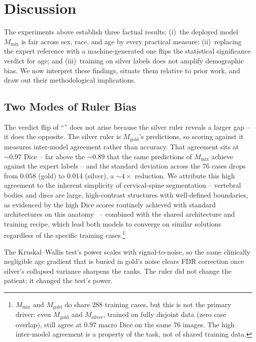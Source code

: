 \section{Discussion}
\label{sec:discussion}

The experiments above establish three factual results: (i)~the deployed model
$M_{\mathrm{mix}}$ is fair across sex, race, and age by every practical measure;
(ii)~replacing the expert reference with a machine-generated one flips the
statistical significance verdict for age; and (iii)~training on silver labels does
not amplify demographic bias. We now interpret these findings, situate them
relative to prior work, and draw out their methodological implications.

\subsection{Two Modes of Ruler Bias}
\label{sec:ruler_modes}

The verdict flip of ``'' does not arise because the
silver ruler reveals a larger gap -- it does the opposite. The silver ruler is
$M_{\mathrm{gold}}$'s predictions, so scoring against it measures inter-model
agreement rather than accuracy. That agreement sits at ${\sim}0.97$ Dice -- far
above the ${\sim}0.89$ that the same predictions of $M_{\mathrm{mix}}$ achieve
against the expert labels -- and the standard
deviation across the $76$ cases drops from $0.058$ (gold) to $0.014$ (silver), a
${\sim}4\times$ reduction. We attribute this high agreement to the inherent
simplicity of cervical-spine segmentation -- vertebral bodies and discs are large,
high-contrast structures with well-defined boundaries, as evidenced by the high
Dice scores routinely achieved with standard architectures on this
anatomy~\cite{zhou2025cspineseg} -- combined with the shared architecture and
training recipe, which lead both models to converge on similar solutions
regardless of the specific training
cases.\footnote{$M_{\mathrm{mix}}$ and $M_{\mathrm{gold}}$ do share $288$
training cases, but this is not the primary driver: even $M_{\mathrm{gold}}$ and
$M_{\mathrm{silver}}$, trained on fully disjoint data (zero case overlap), still
agree at $0.97$ macro Dice on the same $76$ images. The high inter-model agreement
is a property of the task, not of shared training data.}

The Kruskal--Wallis test's power scales with signal-to-noise, so the same
clinically negligible age gradient that is buried in gold's noise clears FDR
correction once silver's collapsed variance sharpens the ranks. The ruler did not
change the patient; it changed the test's power.

